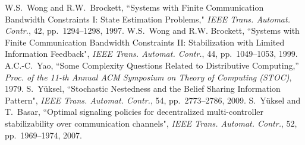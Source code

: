 \documentclass[12pt,onecolumn,draftcls]{IEEEtran}
\begin{document}
\begin{thebibliography}{99}
W.S.\ Wong and R.W.\ Brockett, ``Systems with Finite Communication Bandwidth Constraints {I}: State Estimation Problems," {\em IEEE Trans. Automat. Contr.}, 42, pp.~1294--1298, 1997.
W.S.\ Wong and R.W. Brockett,  ``Systems with Finite Communication Bandwidth Constraints {II}: Stabilization with Limited
Information Feedback", {\em IEEE Trans. Automat. Contr.}, 44, pp.~1049--1053, 1999.
A.C.-C.\ Yao, ``Some Complexity Questions Related to Distributive Computing,'' {\em Proc. of the 11-th Annual ACM Symposium on Theory of Computing (STOC)}, 1979.
S.\ Y\"{u}ksel, ``Stochastic Nestedness and the Belief Sharing Information Pattern", {\em IEEE Trans. Automat. Contr.}, 54, pp.~2773--2786, 2009.
S.\ Y\"{u}ksel and T.\ Basar, ``Optimal signaling policies for decentralized
multi-controller stabilizability over communication channels", {\em IEEE Trans. Automat. Contr.}, 52, pp.~1969--1974, 2007.
\end{thebibliography}
\appendices
\section{}\setcounter{equation}{0}
\setcounter{section}{8}
\end{document}
